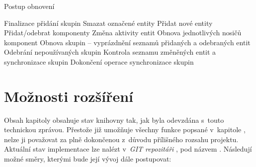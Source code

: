 \begin{algorithm}
	\caption{Postup obnovení}
	\label{Alg:Refresh}
	
	\begin{algorithmic}[1]
		
			\EMBlockStart
				\State Finalizace přidání skupin
			\EMBlockEnd
			\ACBlockStart
				\State Smazat označené entity
				\State Přidat nové entity
				\State Přidat/odebrat komponenty
				\State Změna aktivity entit
			\ACBlockEnd
			\CMBlockStart
				\State Obnova jednotlivých nosičů komponent
			\CMBlockEnd
			\GMBlockStart
				\State Obnova skupin -- vyprázdnění seznamů přidaných a odebraných entit
				\State Odebrání nepoužívaných skupin
				\State Kontrola seznamu změněných entit a synchronizace skupin
				\State Dokončení operace synchronizace skupin
			\GMBlockEnd
		\EndFunction
	\end{algorithmic}
\end{algorithm}

\pagebreak
\section{Možnosti rozšíření}
\label{Chap:ExtensionOptions}

Obsah kapitoly  obsahuje stav knihovny tak, jak byla odevzdána s~touto technickou zprávou. Přestože již umožňuje všechny funkce popsané v~kapitole , nelze ji považovat za plně dokončenou z~důvodu přílišného rozsahu projektu. Aktuální stav implementace lze nalézt v~\emph{GIT repozitáři} \cite{EntropyGit}, pod názvem . Následují možné směry, kterými bude její vývoj dále postupovat: 


